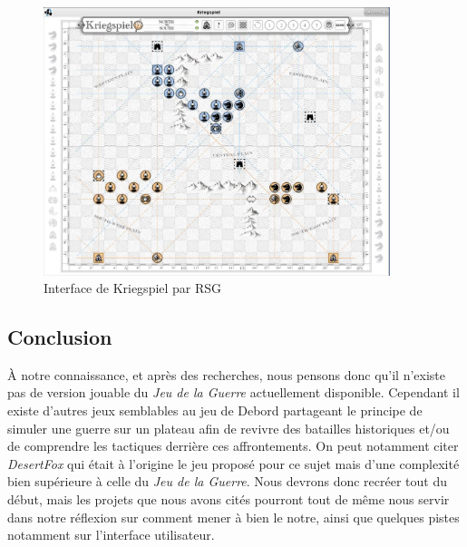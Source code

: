 \documentclass[a4paper]{report}
\begin{document}
\begin{figure}[!h]
\caption{Interface de Kriegspiel par RSG}
\centering
\includegraphics[width=0.9\textwidth]{rsg}
\end{figure}

\subsection*{Conclusion}
\`A notre connaissance, et après des recherches, nous pensons donc qu'il n'existe pas de version jouable du \textit{Jeu de la Guerre} actuellement disponible. Cependant il existe d'autres jeux semblables au jeu de Debord partageant le principe de simuler une guerre sur un plateau afin de revivre des batailles historiques et/ou de comprendre les tactiques derrière ces affrontements. On peut notamment citer \textit{DesertFox}\cite{desertfox} qui était à l'origine le jeu proposé pour ce sujet mais d'une complexité bien supérieure à celle du \textit{Jeu de la Guerre}. Nous devrons donc recréer tout du début, mais les projets que nous avons cités pourront tout de même nous servir dans notre réflexion sur comment mener à bien le notre, ainsi que quelques pistes notamment sur l'interface utilisateur.



\end{document}
